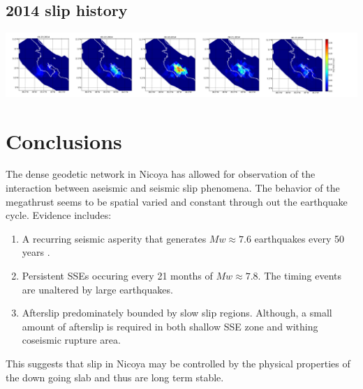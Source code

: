 \documentclass[a0,landscape]{a0poster}
\begin{document}
\begin{multicols}{5}
\subsection*{2014 slip history}
\begin{center}\vspace{1cm}
	\includegraphics[width=30cm]{2014.pdf}
\end{center}\vspace{1cm}





\color{SaddleBrown} %

\section*{Conclusions}
\color{DarkSlateGray}
The dense geodetic network in Nicoya has allowed for observation of the interaction between aseismic and seismic slip phenomena. The behavior of the megathrust seems to be spatial varied and constant through out the earthquake cycle. Evidence includes:
\newline
\begin{enumerate}
\item A recurring seismic asperity that generates $Mw \approx 7.6$ earthquakes every 50 years .
\item Persistent SSEs occuring every 21 months of $Mw \approx 7.8$. The timing events are unaltered by large earthquakes.
\item Afterslip predominately bounded by slow slip regions. Although, a small amount of afterslip is required in both shallow SSE zone and withing coseismic rupture area. 
\end{enumerate}

This suggests that slip in Nicoya may be controlled by the physical properties of the down going slab and thus are long term stable. 







\end{multicols}
\end{document}
